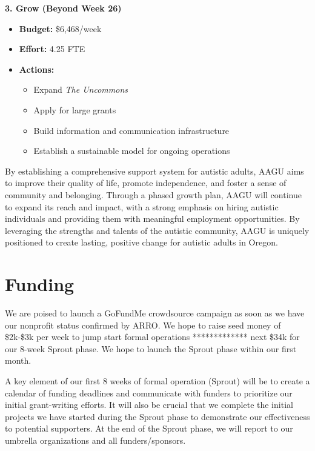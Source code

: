 \documentclass[
  letterpaper,
  DIV=11,
  numbers=noendperiod]{scrreprt}
\providecommand{\tightlist}{%
  \setlength{\itemsep}{0pt}\setlength{\parskip}{0pt}}\usepackage{longtable,booktabs,array}
\begin{document}
\textbf{3. Grow (Beyond Week 26)}

\begin{itemize}
\tightlist
\item
  \textbf{Budget:} \$6,468/week
\item
  \textbf{Effort:} 4.25 FTE
\item
  \textbf{Actions:}

  \begin{itemize}
  \tightlist
  \item
    Expand \emph{The Uncommons}
  \item
    Apply for large grants
  \item
    Build information and communication infrastructure
  \item
    Establish a sustainable model for ongoing operations
  \end{itemize}
\end{itemize}

By establishing a comprehensive support system for autistic adults, AAGU
aims to improve their quality of life, promote independence, and foster
a sense of community and belonging. Through a phased growth plan, AAGU
will continue to expand its reach and impact, with a strong emphasis on
hiring autistic individuals and providing them with meaningful
employment opportunities. By leveraging the strengths and talents of the
autistic community, AAGU is uniquely positioned to create lasting,
positive change for autistic adults in Oregon.


\chapter{Funding}\label{funding}

We are poised to launch a GoFundMe crowdsource campaign as soon as we
have our nonprofit status confirmed by ARRO. We hope to raise seed money
of \$2k-\$3k per week to jump start formal operations ************* next
\$34k for our 8-week Sprout phase. We hope to launch the Sprout phase
within our first month.

A key element of our first 8 weeks of formal operation (Sprout) will be
to create a calendar of funding deadlines and communicate with funders
to prioritize our initial grant-writing efforts. It will also be crucial
that we complete the initial projects we have started during the Sprout
phase to demonstrate our effectiveness to potential supporters. At the
end of the Sprout phase, we will report to our umbrella organizations
and all funders/sponsors.
\end{document}
